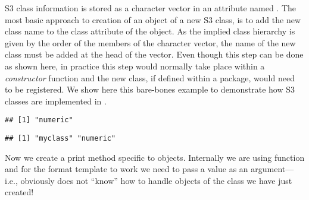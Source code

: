 \documentclass[krantz2]{krantz}\usepackage{knitr}
\begin{document}
\begin{explainbox}
S3 class information is stored as a character vector in an attribute named . The most basic approach to creation of an object of a new S3 class, is to add the new class name to the class attribute of the object. As the implied class hierarchy is given by the order of the members of the character vector, the name of the new class must be added at the head of the vector. Even though this step can be done as shown here, in practice this step would normally take place within a \emph{constructor} function and the new class, if defined within a package, would need to be registered. We show here this bare-bones example to demonstrate how S3 classes are implemented in \Rlang.

\begin{knitrout}\footnotesize
{}\color{fgcolor}\begin{kframe}
\begin{alltt}
 \hlkwb{<-} 
\end{alltt}
\begin{verbatim}
## [1] "numeric"
\end{verbatim}
\begin{alltt}
 \hlkwb{<-} \hlstd{(}\hlstd{,} 
\end{alltt}
\begin{verbatim}
## [1] "myclass" "numeric"
\end{verbatim}
\end{kframe}
\end{knitrout}

Now we create a print method specific to  objects. Internally we are using function  and for the format template to work we need to pass a  value as an argument---i.e., obviously  does not ``know'' how to handle objects of the class we have just created!

\begin{knitrout}\footnotesize
{}\color{fgcolor}
\end{knitrout}


\end{explainbox}
\end{document}
